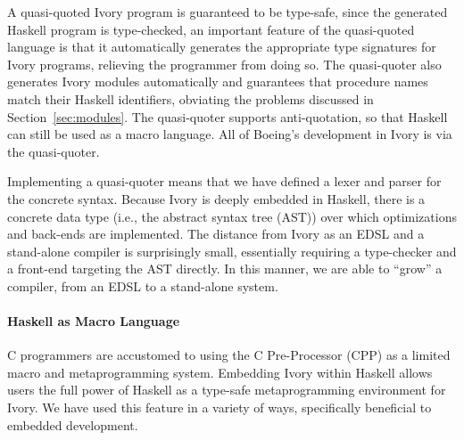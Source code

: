 A quasi-quoted Ivory program is guaranteed to be type-safe, since the generated
Haskell program is type-checked, an important feature of the quasi-quoted
language is that it automatically generates the appropriate type signatures for
Ivory programs, relieving the programmer from doing so. The quasi-quoter also
generates Ivory modules automatically and guarantees that procedure names match
their Haskell identifiers, obviating the problems discussed in
Section~\ref{sec:modules}. The quasi-quoter supports anti-quotation, so that
Haskell can still be used as a macro language. All of Boeing's development in
Ivory is via the quasi-quoter.

Implementing a quasi-quoter means that we have defined a lexer and parser for
the concrete syntax. Because Ivory is deeply embedded in Haskell, there is a
concrete data type (i.e., the abstract syntax tree (AST)) over which
optimizations and back-ends are implemented. The distance from Ivory as an EDSL
and a stand-alone compiler is surprisingly small, essentially requiring a
type-checker and a front-end targeting the AST directly. In this manner, we are
able to ``grow'' a compiler, from an EDSL to a stand-alone system.


\paragraph{Haskell as Macro Language}

C programmers are accustomed to using the C Pre-Processor (CPP) as a
limited macro and metaprogramming system.  Embedding Ivory within
Haskell allows users the full power of Haskell as a type-safe
metaprogramming environment for Ivory. We have used this feature in a
variety of ways, specifically beneficial to embedded development.




